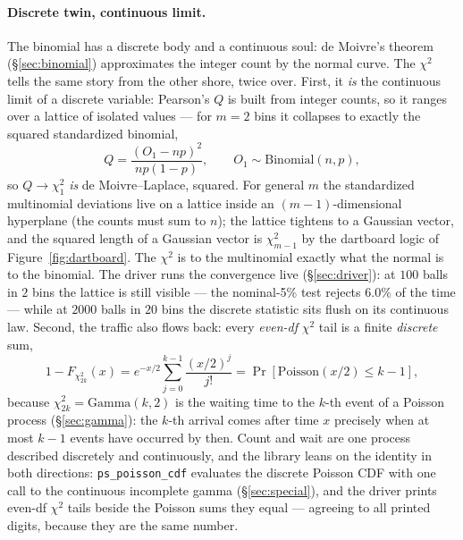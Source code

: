 \documentclass[11pt]{article}
\numberwithin{equation}{section}
\begin{document}
\paragraph{Discrete twin, continuous limit.}
The binomial has a discrete body and a continuous soul: de Moivre's
theorem (\S\ref{sec:binomial}) approximates the integer count by the
normal curve.  The $\chi^2$ tells the same story from the other shore,
twice over.  First, it \emph{is} the continuous limit of a discrete
variable: Pearson's $Q$ is built from integer counts, so it ranges over
a lattice of isolated values --- for $m=2$ bins it collapses to exactly
the squared standardized binomial,
\[
Q=\frac{(O_1-np)^2}{np(1-p)},\qquad O_1\sim\mathrm{Binomial}(n,p),
\]
so $Q\to\chi^2_1$ \emph{is} de Moivre--Laplace, squared.  For general
$m$ the standardized multinomial deviations live on a lattice inside an
$(m-1)$-dimensional hyperplane (the counts must sum to $n$); the
lattice tightens to a Gaussian vector, and the squared length of a
Gaussian vector is $\chi^2_{m-1}$ by the dartboard logic of
Figure~\ref{fig:dartboard}.  The $\chi^2$ is to the multinomial exactly
what the normal is to the binomial.  The driver runs the convergence
live (\S\ref{sec:driver}): at $100$ balls in $2$ bins the lattice is
still visible --- the nominal-5\% test rejects $6.0\%$ of the time ---
while at $2000$ balls in $20$ bins the discrete statistic sits flush on
its continuous law.  Second, the traffic also flows back: every
\emph{even-df} $\chi^2$ tail is a finite \emph{discrete} sum,
\[
1-F_{\chi^2_{2k}}(x)
= e^{-x/2}\sum_{j=0}^{k-1}\frac{(x/2)^j}{j!}
= \Pr[\mathrm{Poisson}(x/2)\le k-1],
\]
because $\chi^2_{2k}=\mathrm{Gamma}(k,2)$ is the waiting time to the
$k$-th event of a Poisson process (\S\ref{sec:gamma}): the $k$-th
arrival comes after time $x$ precisely when at most $k-1$ events have
occurred by then.  Count and wait are one process described discretely
and continuously, and the library leans on the identity in both
directions: \texttt{ps\_poisson\_cdf} evaluates the discrete Poisson
CDF with one call to the continuous incomplete gamma
(\S\ref{sec:special}), and the driver prints even-df $\chi^2$ tails
beside the Poisson sums they equal --- agreeing to all printed digits,
because they are the same number.
\end{document}
